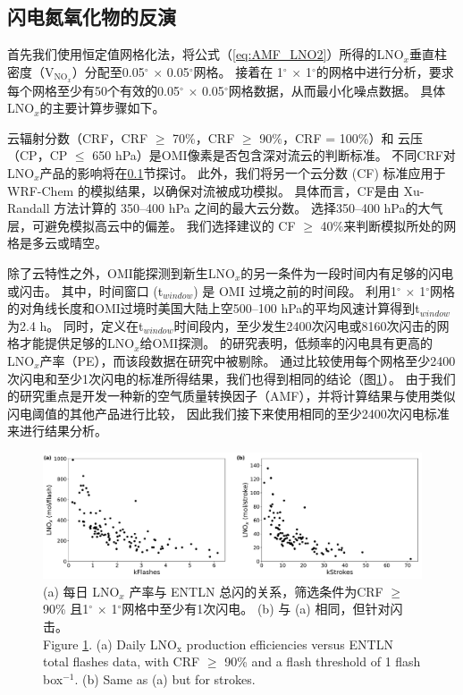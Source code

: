 \subsection{闪电氮氧化物的反演} \label{subsec:retrieval_polluted}

首先我们使用恒定值网格化法，将公式（\ref{eq:AMF_LNO2}）所得的LNO$_x$垂直柱密度（V$_{\textrm{NO$_x$}}$）分配至0.05$^{\circ}$ $\times$ 0.05$^{\circ}$网格\citep{Kuhlmann.2014}。
接着在 1$^{\circ}$ $\times$ 1$^{\circ}$的网格中进行分析，要求每个网格至少有50个有效的0.05$^{\circ}$ $\times$ 0.05$^{\circ}$网格数据，从而最小化噪点数据。
具体LNO$_x$的主要计算步骤如下。

云辐射分数（CRF，CRF $\geq$ 70\%，CRF $\geq$ 90\%，CRF = 100\%）和 云压（CP，CP $\leq$ 650 hPa）是OMI像素是否包含深对流云的判断标准\citep{Ziemke.2009,Choi.2014,Pickering.2016}。
不同CRF对LNO$_x$产品的影响将在\ref{subsec:retrieval_polluted}节探讨。
此外，我们将另一个云分数 (CF) 标准应用于 WRF-Chem 的模拟结果，以确保对流被成功模拟。
具体而言，CF是由 Xu-Randall 方法计算的 350--400 hPa 之间的最大云分数\citep{Xu.1996,Strode.2017}。
选择350--400 hPa的大气层，可避免模拟高云中的偏差。
我们选择\citet{Strode.2017}建议的 CF $\geq$ 40\%来判断模拟所处的网格是多云或晴空。

除了云特性之外，OMI能探测到新生LNO$_x$的另一条件为一段时间内有足够的闪电或闪击。
其中，时间窗口 (t$_{window}$) 是 OMI 过境之前的时间段。
\citet{Lapierre.2020}利用1$^{\circ}$ $\times$ 1$^{\circ}$网格的对角线长度和OMI过境时美国大陆上空500--100 hPa的平均风速计算得到t$_{window}$为2.4 h。
同时，\citet{Lapierre.2020}定义在t$_{window}$时间段内，至少发生2400次闪电或8160次闪击的网格才能提供足够的LNO$_x$给OMI探测。
\citet{Bucsela.2019}的研究表明，低频率的闪电具有更高的LNO$_x$产率（PE），而该段数据在\citet{Lapierre.2020}研究中被剔除。
通过比较使用每个网格至少2400次闪电和至少1次闪电的标准所得结果，我们也得到相同的结论（图\ref{fig:flash_threshold}）。
由于我们的研究重点是开发一种新的空气质量转换因子（AMF），并将计算结果与使用类似闪电阈值的其他产品进行比较\citep{Pickering.2016,Lapierre.2020}，
因此我们接下来使用相同的至少2400次闪电标准来进行结果分析。


\begin{figure}[htbp]
    \includegraphics[width=15cm]{./figures/flash_threshold.pdf}
    \caption{
    (a) 每日 LNO$_x$ 产率与 ENTLN 总闪的关系，筛选条件为CRF $\geq$ 90\% 且1$^{\circ}$ $\times$ 1$^{\circ}$网格中至少有1次闪电。
     (b) 与 (a) 相同，但针对闪击。\\
    Figure \ref{fig:flash_threshold}. (a) Daily LNO$_\textrm{x}$ production efficiencies versus ENTLN total flashes data, with CRF $\geq$ 90\% and a flash threshold of 1 flash box$^{-1}$.
    (b) Same as (a) but for strokes.}
    \label{fig:flash_threshold}
\end{figure}


